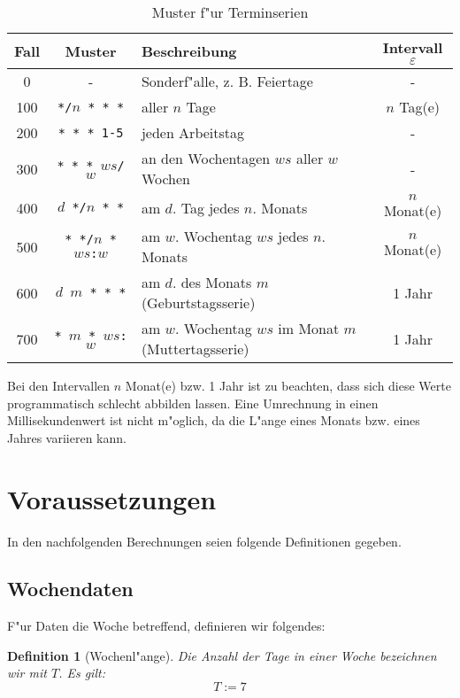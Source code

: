 \documentclass[a4paper]{article}
\numberwithin{equation}{section}
\newtheorem{dfn}{Definition}
\begin{document}
\setcounter{footnote}{1}
\begin{table}[ht]
\caption{Muster f"ur Terminserien}
\label{tab:pattern}\begin{tabularx}{\textwidth}{ccXc}
\hline
Fall & Muster & Beschreibung & Intervall $\varepsilon$ \\
\hline
0 & - & Sonderf"alle, z. B. Feiertage & - \\
100 & \texttt{*/$n$ * * *} & aller $n$ Tage & $n$ Tag(e) \\
200 & \texttt{* * * 1-5} & jeden Arbeitstag & - \\
300 & \texttt{* * * $ws$/$w$} & an den Wochentagen $ws$ aller $w$ Wochen & - \\
400 & \texttt{$d$ */$n$ * *} & am $d$. Tag jedes $n$. Monats & $n$ Monat(e) \\
500 & \texttt{* */$n$ * $ws$:$w$} & am $w$. Wochentag $ws$ jedes $n$. Monats &
  $n$ Monat(e)\footnotemark[\ref{ft:oneMonth}] \\
600 & \texttt{$d$ $m$ * * *} & am $d$. des Monats $m$ (Geburtstagsserie) &
  1 Jahr \\
700 & \texttt{* $m$ * $ws$:$w$} & am $w$. Wochentag $ws$ im Monat $m$
  (Muttertagsserie) & 1 Jahr\footnotemark[\ref{ft:oneMonth}] \\
\hline
\end{tabularx}\end{table}

\label{badInterval}
Bei den Intervallen $n$ Monat(e) bzw. 1 Jahr ist zu beachten, dass sich diese
Werte programmatisch schlecht abbilden lassen. Eine Umrechnung in einen
Millisekundenwert ist nicht m"oglich, da die L"ange eines Monats bzw. eines
Jahres variieren kann.



%
%
%
%
\section{Voraussetzungen}
In den nachfolgenden Berechnungen seien folgende Definitionen gegeben.


%
%
\subsection{Wochendaten}
F"ur Daten die Woche betreffend, definieren wir folgendes:
\begin{dfn}[Wochenl"ange]
Die Anzahl der Tage in einer Woche bezeichnen wir mit $T$. Es gilt:
\begin{equation}T := 7\end{equation}
\end{dfn}
\end{document}
